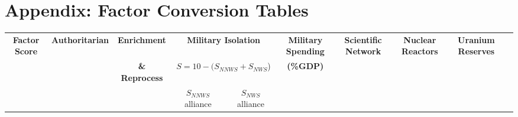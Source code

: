 \section{Appendix: Factor Conversion Tables}
\label{s_appendix}

\begin{table}
\centering
\begin{tabular}{|c|c|c|c|c|c|c|c|c|c|}
\hline
\textbf{Factor Score} & \textbf{Authoritarian} & \textbf{Enrichment}  & \multicolumn{2}{c|}{\textbf{Military Isolation}}    & \textbf{Military Spending} & \textbf{Scientific Network} & \textbf{Nuclear Reactors}  & \textbf{Uranium Reserves} \\
                     &                        &  \textbf{\& Reprocess}& \multicolumn{2}{c|}{$S = 10 - (S_{NNWS} + S_{NWS}$)} & \textbf{(\%GDP)}           &                             &                            &  \\
\cline{4-5}
                    &                         &                        &  $S_{NNWS}$ alliance   & $S_{NWS}$ alliance          &                           &                             &                            & \\



\end{tabular}
\end{table}
